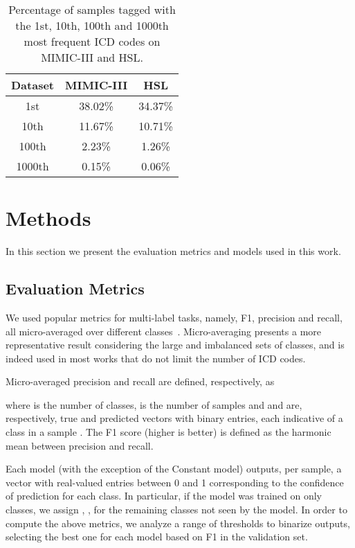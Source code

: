 \documentclass[runningheads]{llncs}
\begin{document}
\begin{table}[t]
	\centering
	\caption{Percentage of samples tagged with the 1st, 10th, 100th and 1000th most frequent ICD codes on MIMIC-III and HSL.}
	\begin{tabular}{c|c|c}
		Dataset & MIMIC-III &   HSL   \\ \hline\hline
		  1st   &  38.02\%  & 34.37\% \\ \hline
		 10th   &  11.67\%  & 10.71\% \\ \hline
		 100th  &  2.23\%   & 1.26\%  \\ \hline
		1000th  &  0.15\%   & 0.06\%
	\end{tabular}
	\label{tab:datasets_icd_dist}
\end{table}












\section{Methods}

In this section we present the evaluation metrics and models used in this work. 

\subsection{Evaluation Metrics}

We used popular metrics for multi-label tasks, namely, F1, precision and recall, all micro-averaged over different classes~\cite{liAutomatedICD9Coding2019a}. Micro-averaging presents a more representative result considering the large and imbalanced sets of classes, and is indeed used in most works that do not limit the number of ICD codes.

Micro-averaged precision and recall are defined, respectively, as

where  is the number of classes,  is the number of samples and  and  are, respectively, true and predicted vectors with  binary entries, each indicative of a class  in a sample . The F1 score (higher is better) is defined as the harmonic mean between precision and recall.

Each model (with the exception of the Constant model) outputs, per sample, a vector with  real-valued entries between 0 and 1 corresponding to the confidence of prediction for each class. In particular, if the model was trained on only  classes, we assign , , for the remaining classes  not seen by the model. In order to compute the above metrics, we analyze a range of thresholds to binarize outputs, selecting the best one for each model based on F1 in the validation set.
\end{document}

